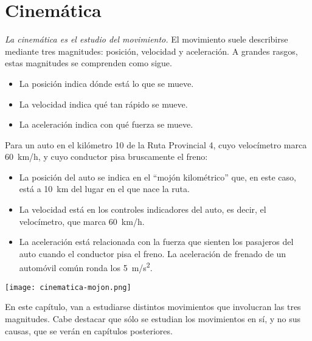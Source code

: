 \chapter{Cinemática}

\emph{La cinemática es el estudio del movimiento.}
El movimiento suele describirse mediante tres magnitudes: posición, velocidad y aceleración.
A grandes rasgos, estas magnitudes se comprenden como sigue.
\begin{itemize}
    \item La posición indica dónde está lo que se mueve.
    \item La velocidad indica qué tan rápido se mueve.
    \item La aceleración indica con qué fuerza se mueve.
\end{itemize}

\begin{mdframed}[style=ExampleFrame]
    \begin{example}
        \label{eg:mag}
    \end{example}

    Para un auto en el kilómetro 10 de la Ruta Provincial 4, cuyo velocímetro marca \SI{60}{\kilo\meter/\hour}, y cuyo conductor pisa bruscamente el freno:
    \begin{itemize}
        \item La posición del auto se indica en el ``mojón kilométrico'' que, en este caso, está a \SI{10}{km} del lugar en el que nace la ruta.
        \item La velocidad está en los controles indicadores del auto, es decir, el velocímetro, que marca \SI{60}{\kilo\meter/\hour}.
        \item La aceleración está relacionada con la fuerza que sienten los pasajeros del auto cuando el conductor pisa el freno.
        La aceleración de frenado de un automóvil común ronda los \SI{5}{\meter/\second\squared}.
    \end{itemize}

    \begin{center}
        \texttt{[image: cinematica-mojon.png]}
    \end{center}
\end{mdframed}

En este capítulo, van a estudiarse distintos movimientos que involucran las tres magnitudes.
Cabe destacar que sólo se estudian los movimientos en sí, y no sus causas, que se verán en capítulos posteriores.


